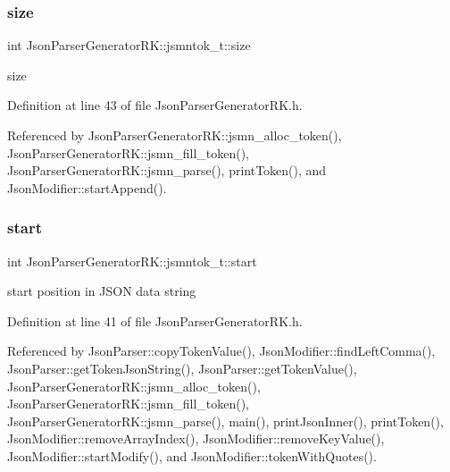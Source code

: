 \subsubsection{\texorpdfstring{size}{size}}
{\footnotesize\ttfamily int Json\+Parser\+Generator\+R\+K\+::jsmntok\+\_\+t\+::size}



size 



Definition at line 43 of file Json\+Parser\+Generator\+R\+K.\+h.



Referenced by Json\+Parser\+Generator\+R\+K\+::jsmn\+\_\+alloc\+\_\+token(), Json\+Parser\+Generator\+R\+K\+::jsmn\+\_\+fill\+\_\+token(), Json\+Parser\+Generator\+R\+K\+::jsmn\+\_\+parse(), print\+Token(), and Json\+Modifier\+::start\+Append().

\mbox{\label{struct_json_parser_generator_r_k_1_1jsmntok__t_a4fb68e88a6a7c366289a92c8b1332f4f}} 
\subsubsection{\texorpdfstring{start}{start}}
{\footnotesize\ttfamily int Json\+Parser\+Generator\+R\+K\+::jsmntok\+\_\+t\+::start}



start position in J\+S\+ON data string 



Definition at line 41 of file Json\+Parser\+Generator\+R\+K.\+h.



Referenced by Json\+Parser\+::copy\+Token\+Value(), Json\+Modifier\+::find\+Left\+Comma(), Json\+Parser\+::get\+Token\+Json\+String(), Json\+Parser\+::get\+Token\+Value(), Json\+Parser\+Generator\+R\+K\+::jsmn\+\_\+alloc\+\_\+token(), Json\+Parser\+Generator\+R\+K\+::jsmn\+\_\+fill\+\_\+token(), Json\+Parser\+Generator\+R\+K\+::jsmn\+\_\+parse(), main(), print\+Json\+Inner(), print\+Token(), Json\+Modifier\+::remove\+Array\+Index(), Json\+Modifier\+::remove\+Key\+Value(), Json\+Modifier\+::start\+Modify(), and Json\+Modifier\+::token\+With\+Quotes().

\mbox{\label{struct_json_parser_generator_r_k_1_1jsmntok__t_af74f112dd9655aaa8da0a91e7c8f3495}} 
